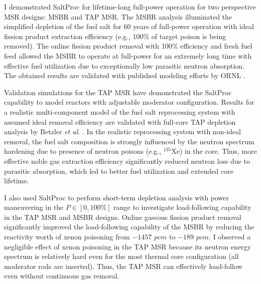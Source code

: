 I demonstrated SaltProc for lifetime-long full-power operation for two 
perspective \gls{MSR} designs: \gls{MSBR} and \gls{TAP} \gls{MSR}. The 
\gls{MSBR} analysis illuminated the simplified depletion of the fuel salt for 
60 years of full-power operation with ideal fission product extraction 
efficiency (e.g., 100\% of target poison is being removed). The online fission 
product removal with 100\% efficiency and fresh fuel feed allowed the 
\gls{MSBR} to operate at full-power for an extremely long time with effective 
fuel utilization due to exceptionally low parasitic neutron absorption. The 
obtained results are validated with published modeling efforts by \gls{ORNL} 
\cite{betzler_molten_2017}.

Validation simulations for the \gls{TAP} \gls{MSR} have demonstrated the 
SaltProc capability to model reactors with adjustable moderator configuration. 
Results for a realistic multi-component model of the fuel salt reprocessing 
system with assumed ideal removal efficiency are validated with full-core 
\gls{TAP} depletion analysis by Betzler \emph{et al.} 
\cite{betzler_assessment_2017-1}. 
In the realistic reprocessing system with non-ideal removal, the fuel salt 
composition is strongly influenced by the neutron spectrum hardening due to 
presence of neutron poisons (e.g., $^{135}$Xe) in the core. Thus, more 
effective noble gas extraction efficiency significantly reduced neutron loss 
due to parasitic absorption, which led to
better fuel utilization and extended 
core lifetime.

I also used SaltProc to perform short-term depletion analysis 
with power maneuvering in the $P\in[0,100\%]$ range to investigate 
load-following capability in the \gls{TAP} \gls{MSR} and \gls{MSBR} designs. 
Online gaseous fission product removal significantly improved the 
load-following capability of the \gls{MSBR} by reducing the reactivity worth 
of xenon poisoning from $-1457$ $pcm$ to $-189$ $pcm$. I observed a negligible 
effect of xenon poisoning in the \gls{TAP} \gls{MSR} because its neutron 
energy spectrum is relatively hard even for the most thermal core 
configuration (all moderator rods are inserted). Thus, the \gls{TAP} \gls{MSR} 
can effectively load-follow even without continuous gas removal.

